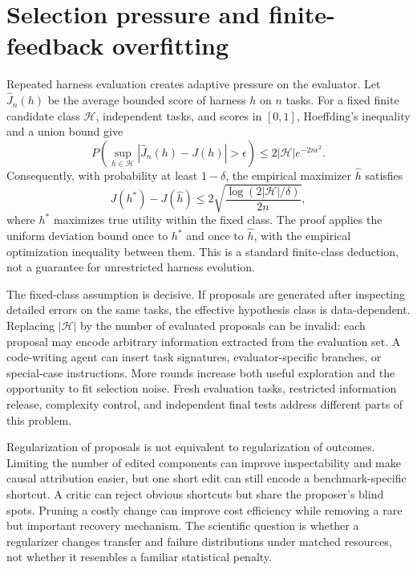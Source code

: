 \section{Selection pressure and finite-feedback overfitting}\label{sec:C30:02}
Repeated harness evaluation creates adaptive pressure on the evaluator. Let $\widehat J_n(h)$ be the average bounded score of harness $h$ on $n$ tasks. For a fixed finite candidate class $\mathcal H$, independent tasks, and scores in $[0,1]$, Hoeffding's inequality and a union bound give
\begin{equation}
 P\left(\sup_{h\in\mathcal H}
 |\widehat J_n(h)-J(h)|>\epsilon\right)
 \leq2|\mathcal H|e^{-2n\epsilon^2}.
\end{equation}
Consequently, with probability at least $1-\delta$, the empirical maximizer $\widehat h$ satisfies
\begin{equation}
 J(h^*)-J(\widehat h)
 \leq2\sqrt{\frac{\log(2|\mathcal H|/\delta)}{2n}},
 \label{eq:c30:selectionbound}
\end{equation}
where $h^*$ maximizes true utility within the fixed class. The proof applies the uniform deviation bound once to $h^*$ and once to $\widehat h$, with the empirical optimization inequality between them. This is a standard finite-class deduction, not a guarantee for unrestricted harness evolution.

The fixed-class assumption is decisive. If proposals are generated after inspecting detailed errors on the same tasks, the effective hypothesis class is data-dependent. Replacing $|\mathcal H|$ by the number of evaluated proposals can be invalid: each proposal may encode arbitrary information extracted from the evaluation set. A code-writing agent can insert task signatures, evaluator-specific branches, or special-case instructions. More rounds increase both useful exploration and the opportunity to fit selection noise. Fresh evaluation tasks, restricted information release, complexity control, and independent final tests address different parts of this problem.

Regularization of proposals is not equivalent to regularization of outcomes. Limiting the number of edited components can improve inspectability and make causal attribution easier, but one short edit can still encode a benchmark-specific shortcut. A critic can reject obvious shortcuts but share the proposer's blind spots. Pruning a costly change can improve cost efficiency while removing a rare but important recovery mechanism. The scientific question is whether a regularizer changes transfer and failure distributions under matched resources, not whether it resembles a familiar statistical penalty.

